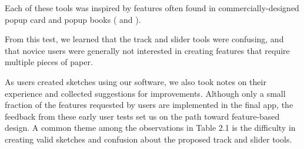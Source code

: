 Each of these tools was inspired by features often found in
commercially-designed popup card and popup books
(\citet{birmingham1997pop} and \citet{valenta1997pop}).

From this test, we learned that the track and slider tools were
confusing, and that novice users were generally not interested in
creating features that require multiple pieces of paper.

As users created sketches using our software, we also took notes on
their experience and collected suggestions for improvements. Although
only a small fraction of the features requested by users are implemented
in the final app, the feedback from these early user tests set us on the
path toward feature-based design. A common theme among the observations
in Table 2.1 is the difficulty in creating valid sketches and confusion
about the proposed track and slider tools.

